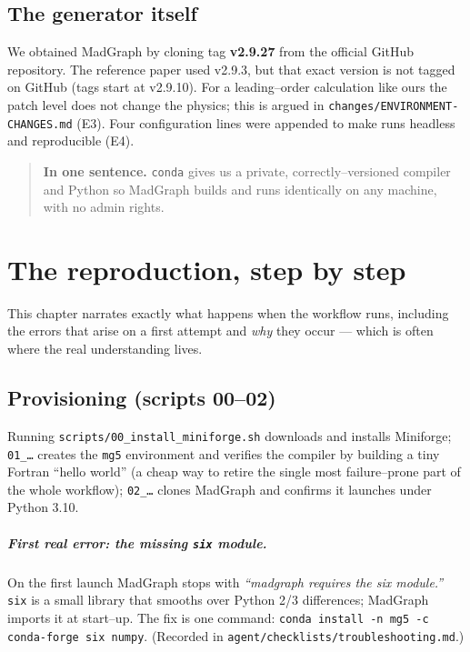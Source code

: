 \documentclass[11pt,oneside]{report}
\newcommand{\code}[1]{\texttt{#1}}
\begin{document}
\section{The generator itself}
We obtained MadGraph by cloning tag \textbf{v2.9.27} from the official GitHub repository. The
reference paper used v2.9.3, but that exact version is not tagged on GitHub (tags start at v2.9.10).
For a leading--order calculation like ours the patch level does not change the physics; this is
argued in \code{changes/ENVIRONMENT-CHANGES.md} (E3). Four configuration lines were appended to make
runs headless and reproducible (E4).

\begin{quote}\textbf{In one sentence.} \code{conda} gives us a private, correctly--versioned
compiler and Python so MadGraph builds and runs identically on any machine, with no admin
rights.\end{quote}

\chapter{The reproduction, step by step}
\label{ch:repro}

This chapter narrates exactly what happens when the workflow runs, including the errors that arise
on a first attempt and \emph{why} they occur --- which is often where the real understanding lives.

\section{Provisioning (scripts 00--02)}
Running \code{scripts/00\_install\_miniforge.sh} downloads and installs Miniforge; \code{01\_\dots}
creates the \code{mg5} environment and verifies the compiler by building a tiny Fortran ``hello
world'' (a cheap way to retire the single most failure--prone part of the whole workflow);
\code{02\_\dots} clones MadGraph and confirms it launches under Python 3.10.

\paragraph{First real error: the missing \code{six} module.} On the first launch MadGraph stops
with \emph{``madgraph requires the six module.''} \code{six} is a small library that smooths over
Python 2/3 differences; MadGraph imports it at start--up. The fix is one command:
\code{conda install -n mg5 -c conda-forge six numpy}. (Recorded in
\code{agent/checklists/troubleshooting.md}.)
\end{document}

